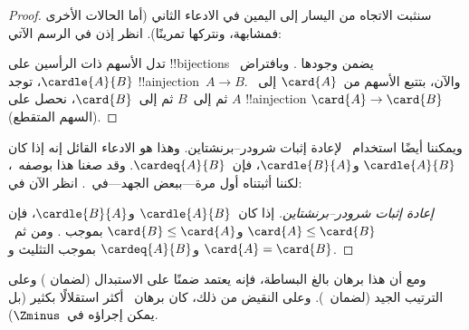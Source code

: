 \documentclass[../../../include/open-logic-section]{subfiles}
\begin{document}
\begin{proof}
سنثبت الاتجاه من اليسار إلى اليمين في الادعاء الثاني (أما الحالات
الأخرى فمشابهة، ونتركها تمرينًا). انظر إذن في الرسم الآتي:
\begin{center}
\end{center}
تدل الأسهم ذات الرأسين على !!{bijection}s يضمن وجودها
. وبافتراض~$\cardle{A}{B}$، توجد
!!a{injection}~$A\to B$. والآن، بتتبع الأسهم من~$\card{A}$ إلى~$A$
ثم إلى~$B$ ثم إلى~$\card{B}$، نحصل على !!a{injection}
$\card{A} \to \card{B}$ (السهم المتقطع).
\end{proof}\noindent
ويمكننا أيضًا استخدام~ لإعادة إثبات
شرودر--برنشتاين. وهذا هو الادعاء القائل إنه إذا كان
$\cardle{A}{B}$ و$\cardle{B}{A}$، فإن~$\cardeq{A}{B}$. وقد صغنا هذا
بوصفه~، لكننا أثبتناه
أول مرة---ببعض الجهد---في~.
انظر الآن في:

\begin{proof}[إعادة إثبات شرودر--برنشتاين]
إذا كان~$\cardle{A}{B}$ و$\cardle{B}{A}$، فإن
$\card{A} \leq \card{B}$ و$\card{B} \leq \card{A}$ بموجب
. ومن ثم~$\card{A} = \card{B}$
و$\cardeq{A}{B}$ بموجب التثليث و.
\end{proof}
\noindent
ومع أن هذا برهان بالغ البساطة، فإنه يعتمد ضمنًا على الاستبدال (لضمان
) وعلى الترتيب
الجيد (لضمان~). وعلى النقيض من ذلك،
كان برهان~ أكثر استقلالًا بكثير
(بل يمكن إجراؤه في~$\Zminus$).
\end{document}
